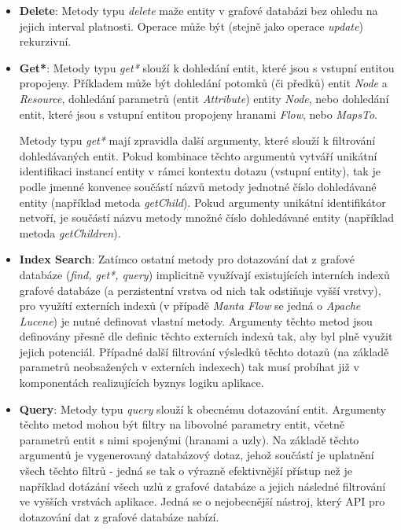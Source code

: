 \begin{itemize}
   \item{\textbf{Delete}}: Metody typu \textit{delete} maže entity v grafové databázi bez ohledu na jejich interval platnosti. Operace může být (stejně jako operace \textit{update}) rekurzivní.

   \item{\textbf{Get*}}: Metody typu \textit{get*} slouží k dohledání entit, které jsou s vstupní entitou propojeny. Příkladem může být dohledání potomků (či předků) entit \textit{Node} a \textit{Resource}, dohledání parametrů (entit \textit{Attribute}) entity \textit{Node}, nebo dohledání entit, které jsou s vstupní entitou propojeny hranami \textit{Flow}, nebo \textit{MapsTo}.

   Metody typu \textit{get*} mají zpravidla další argumenty, které slouží k filtrování dohledávaných entit. Pokud kombinace těchto argumentů vytváří unikátní identifikaci instancí entity v rámci kontextu dotazu (vstupní entity), tak je podle jmenné konvence součástí názvů metody jednotné číslo dohledávané entity (například metoda \textit{getChild}). Pokud argumenty unikátní identifikátor netvoří, je součástí názvu metody množné číslo dohledávané entity (například metoda \textit{getChildren}).

   \item{\textbf{Index Search}}: Zatímco ostatní metody pro dotazování dat z grafové databáze (\textit{find, get*, query}) implicitně využívají existujících interních indexů grafové databáze (a perzistentní vrstva od nich tak odstiňuje vyšší vrstvy), pro využítí externích indexů (v případě \textit{Manta Flow} se jedná o \textit{Apache Lucene}) je nutné definovat vlastní metody. Argumenty těchto metod jsou definovány přesně dle definic těchto externích indexů tak, aby byl plně využit jejich potenciál. Případné další filtrování výsledků těchto dotazů (na základě parametrů neobsažených v externích indexech) tak musí probíhat již v komponentách realizujících byznys logiku aplikace.

   \item{\textbf{Query}}: Metody typu \textit{query} slouží k obecnému dotazování entit. Argumenty těchto metod mohou být filtry  na libovolné parametry entit, včetně parametrů entit s nimi spojenými (hranami a uzly). Na základě těchto argumentů je vygenerovaný databázový dotaz, jehož součástí je uplatnění všech těchto filtrů - jedná se tak o výrazně efektivnější přístup než je například dotázání všech uzlů z grafové databáze a jejich následné filtrování ve vyšších vrstvách aplikace. Jedná se o nejobecnější nástroj, který API pro dotazování dat z grafové databáze nabízí.
\end{itemize}

